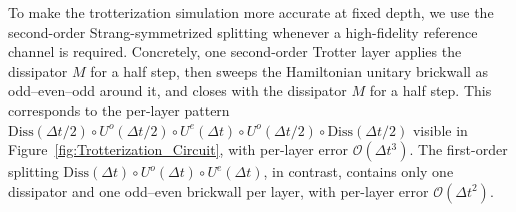\documentclass[%
 reprint,
superscriptaddress,
 amsmath,amssymb,
 aps,
]{revtex4-2}
\begin{document}
To make the trotterization simulation more accurate at fixed depth, we use the second-order Strang-symmetrized splitting whenever a high-fidelity reference channel is required. Concretely, one second-order Trotter layer applies the dissipator $M$ for a half step, then sweeps the Hamiltonian unitary brickwall as odd--even--odd around it, and closes with the dissipator $M$ for a half step. This corresponds to the per-layer pattern
$
\mathrm{Diss}(\Delta t/2)\circ U^o(\Delta t/2)\circ U^e(\Delta t)\circ U^o(\Delta t/2)\circ \mathrm{Diss}(\Delta t/2)
$
visible in Figure~\ref{fig:Trotterization_Circuit}, with per-layer error $\mathcal{O}(\Delta t^3)$. The first-order splitting $\mathrm{Diss}(\Delta t)\circ U^o(\Delta t)\circ U^e(\Delta t)$, in contrast, contains only one dissipator and one odd--even brickwall per layer, with per-layer error $\mathcal{O}(\Delta t^2)$.
\end{document}
